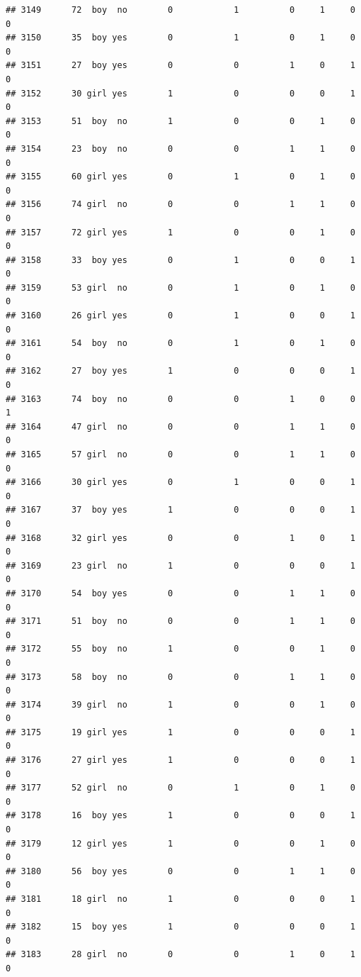 \documentclass[man]{apa6}
\begin{document}
\begin{verbatim}
## 3149      72  boy  no        0            1          0     1     0     0
## 3150      35  boy yes        0            1          0     1     0     0
## 3151      27  boy yes        0            0          1     0     1     0
## 3152      30 girl yes        1            0          0     0     1     0
## 3153      51  boy  no        1            0          0     1     0     0
## 3154      23  boy  no        0            0          1     1     0     0
## 3155      60 girl yes        0            1          0     1     0     0
## 3156      74 girl  no        0            0          1     1     0     0
## 3157      72 girl yes        1            0          0     1     0     0
## 3158      33  boy yes        0            1          0     0     1     0
## 3159      53 girl  no        0            1          0     1     0     0
## 3160      26 girl yes        0            1          0     0     1     0
## 3161      54  boy  no        0            1          0     1     0     0
## 3162      27  boy yes        1            0          0     0     1     0
## 3163      74  boy  no        0            0          1     0     0     1
## 3164      47 girl  no        0            0          1     1     0     0
## 3165      57 girl  no        0            0          1     1     0     0
## 3166      30 girl yes        0            1          0     0     1     0
## 3167      37  boy yes        1            0          0     0     1     0
## 3168      32 girl yes        0            0          1     0     1     0
## 3169      23 girl  no        1            0          0     0     1     0
## 3170      54  boy yes        0            0          1     1     0     0
## 3171      51  boy  no        0            0          1     1     0     0
## 3172      55  boy  no        1            0          0     1     0     0
## 3173      58  boy  no        0            0          1     1     0     0
## 3174      39 girl  no        1            0          0     1     0     0
## 3175      19 girl yes        1            0          0     0     1     0
## 3176      27 girl yes        1            0          0     0     1     0
## 3177      52 girl  no        0            1          0     1     0     0
## 3178      16  boy yes        1            0          0     0     1     0
## 3179      12 girl yes        1            0          0     1     0     0
## 3180      56  boy yes        0            0          1     1     0     0
## 3181      18 girl  no        1            0          0     0     1     0
## 3182      15  boy yes        1            0          0     0     1     0
## 3183      28 girl  no        0            0          1     0     1     0

\end{verbatim}
\end{document}
